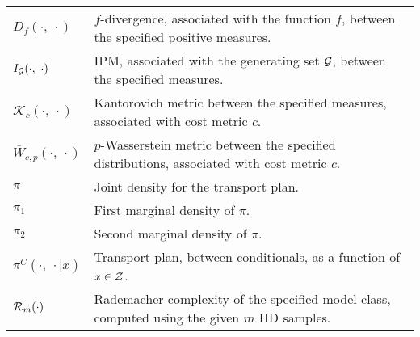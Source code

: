 \begin{tabular}{@{}l  p{125mm}@{}}
$D_f(\cdot, \ \cdot)$ & $f$-divergence, associated with the function $f$, between the specified positive measures.\\
$I_{\mathcal{G}}(\cdot, \ \cdot)$ & IPM, associated with the generating set $\mathcal{G}$, between the specified measures. \\
$\mathcal{K}_c(\cdot, \ \cdot)$ & Kantorovich metric between the specified measures, associated with cost metric $c$.\\
$\bar{W}_{c, p}(\cdot, \ \cdot)$ & $p$-Wasserstein metric between the specified distributions, associated with cost metric $c$.\\
$\pi$ & Joint density for the transport plan.\\
$\pi_1$ & First marginal density of $\pi$.\\
$\pi_2$ & Second marginal density of $\pi$.\\
$\pi^C(\cdot,\ \cdot|x)$ & Transport plan, between conditionals, as a function of $x\in \mathcal{Z}$.\\
$\mathcal{R}_m(\cdot)$ & Rademacher complexity of the specified model class, computed using the given $m$ IID samples.
\end{tabular}

